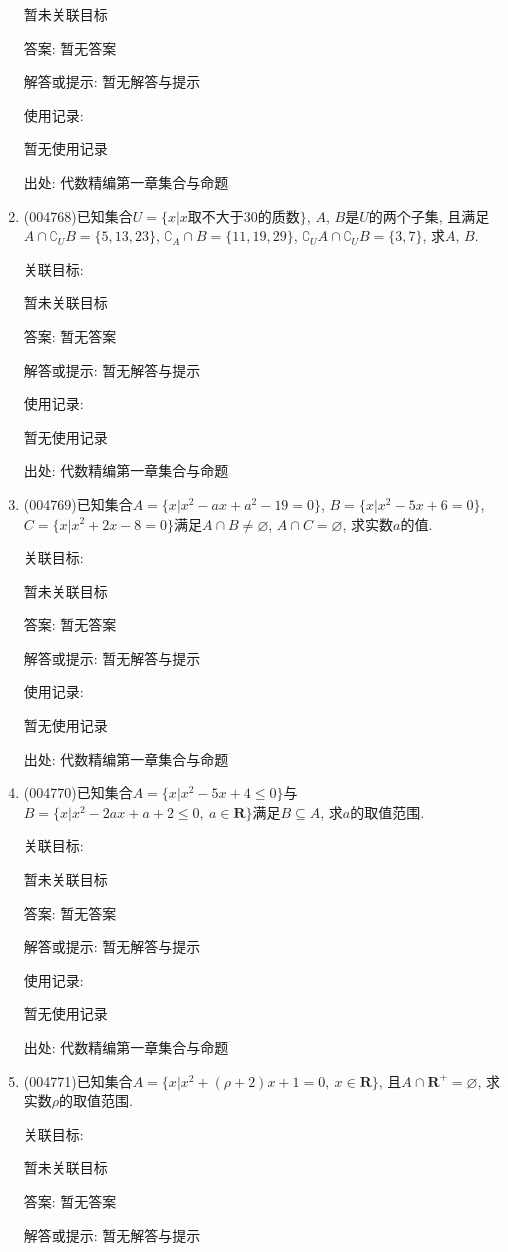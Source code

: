 \documentclass[10pt,a4paper]{article}
\begin{document}
\begin{enumerate}[1.]
暂未关联目标

答案: 暂无答案

解答或提示: 暂无解答与提示

使用记录:

暂无使用记录


出处: 代数精编第一章集合与命题
\item { (004768)}已知集合$U =\{x|x\text{取不大于}30\text{的质数}\}$, $A$, $B$是$U$的两个子集, 且满足$A\cap \complement_UB=\{5,13,23\}$, $\complement_A\cap B=\{11,19,29\}$, $\complement_UA\cap \complement_UB=\{3,7\}$, 求$A$, $B$.


关联目标:

暂未关联目标

答案: 暂无答案

解答或提示: 暂无解答与提示

使用记录:

暂无使用记录


出处: 代数精编第一章集合与命题
\item { (004769)}已知集合$A=\{x|x^2- ax+a^2-19=0\}$, $B=\{x|x^2-5x+6=0\}$, $C=\{ x|x^2+2x-8=0\}$满足$A\cap B\ne \varnothing$, $A\cap C=\varnothing$, 求实数$a$的值.


关联目标:

暂未关联目标

答案: 暂无答案

解答或提示: 暂无解答与提示

使用记录:

暂无使用记录


出处: 代数精编第一章集合与命题
\item { (004770)}已知集合$A=\{x|x^2-5x+4\le 0\}$与$B=\{x|x^2-2ax+a+2\le 0,\ a\in \mathbf{R}\}$满足$B\subseteq A$, 求$a$的取值范围.


关联目标:

暂未关联目标

答案: 暂无答案

解答或提示: 暂无解答与提示

使用记录:

暂无使用记录


出处: 代数精编第一章集合与命题
\item { (004771)}已知集合$A=\{x|x^2 +(\rho +2)x+1=0, \ x\in \mathbf{R}\}$, 且$A\cap \mathbf{R}^+=\varnothing$, 求实数$\rho$的取值范围.


关联目标:

暂未关联目标

答案: 暂无答案

解答或提示: 暂无解答与提示


\end{enumerate}
\end{document}
